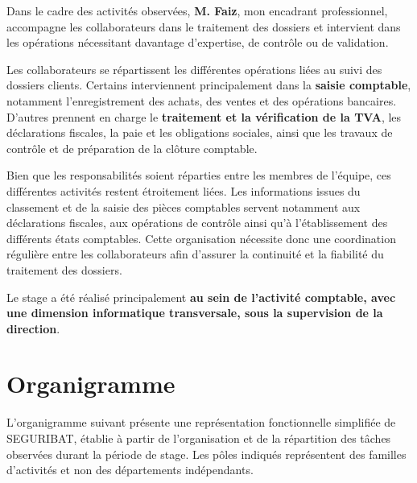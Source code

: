 \documentclass[12pt,a4paper,oneside]{report}
\begin{document}
Dans le cadre des activités observées, \textbf{M. Faiz}, mon encadrant professionnel, accompagne les collaborateurs dans le traitement des dossiers et intervient dans les opérations nécessitant davantage d'expertise, de contrôle ou de validation.

Les collaborateurs se répartissent les différentes opérations liées au suivi des dossiers clients. Certains interviennent principalement dans la \textbf{saisie comptable}, notamment l'enregistrement des achats, des ventes et des opérations bancaires. D'autres prennent en charge le \textbf{traitement et la vérification de la TVA}, les déclarations fiscales, la paie et les obligations sociales, ainsi que les travaux de contrôle et de préparation de la clôture comptable.

Bien que les responsabilités soient réparties entre les membres de l'équipe, ces différentes activités restent étroitement liées. Les informations issues du classement et de la saisie des pièces comptables servent notamment aux déclarations fiscales, aux opérations de contrôle ainsi qu'à l'établissement des différents états comptables. Cette organisation nécessite donc une coordination régulière entre les collaborateurs afin d'assurer la continuité et la fiabilité du traitement des dossiers.

Le stage a été réalisé principalement \textbf{au sein de l'activité comptable, avec une dimension informatique transversale, sous la supervision de la direction}.

\section{Organigramme}

L'organigramme suivant présente une représentation fonctionnelle simplifiée de SEGURIBAT, établie à partir de l'organisation et de la répartition des tâches observées durant la période de stage. Les pôles indiqués représentent des familles d'activités et non des départements indépendants.
\end{document}
